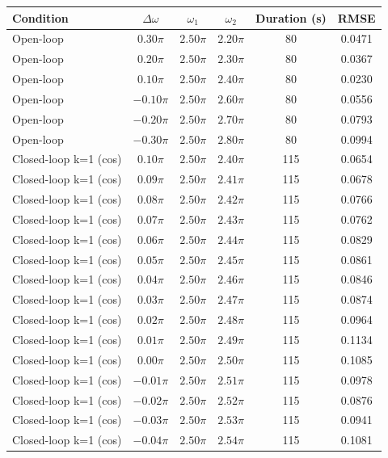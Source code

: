 \begin{tabular}{lccccc}
\toprule
Condition & $\Delta\omega$ & $\omega_1$ & $\omega_2$ & Duration (s) & RMSE \\
\midrule
Open-loop & $0.30\pi$ & $2.50\pi$ & $2.20\pi$ & 80 & 0.0471 \\
Open-loop & $0.20\pi$ & $2.50\pi$ & $2.30\pi$ & 80 & 0.0367 \\
Open-loop & $0.10\pi$ & $2.50\pi$ & $2.40\pi$ & 80 & 0.0230 \\
Open-loop & $-0.10\pi$ & $2.50\pi$ & $2.60\pi$ & 80 & 0.0556 \\
Open-loop & $-0.20\pi$ & $2.50\pi$ & $2.70\pi$ & 80 & 0.0793 \\
Open-loop & $-0.30\pi$ & $2.50\pi$ & $2.80\pi$ & 80 & 0.0994 \\
Closed-loop k=1 (cos) & $0.10\pi$ & $2.50\pi$ & $2.40\pi$ & 115 & 0.0654 \\
Closed-loop k=1 (cos) & $0.09\pi$ & $2.50\pi$ & $2.41\pi$ & 115 & 0.0678 \\
Closed-loop k=1 (cos) & $0.08\pi$ & $2.50\pi$ & $2.42\pi$ & 115 & 0.0766 \\
Closed-loop k=1 (cos) & $0.07\pi$ & $2.50\pi$ & $2.43\pi$ & 115 & 0.0762 \\
Closed-loop k=1 (cos) & $0.06\pi$ & $2.50\pi$ & $2.44\pi$ & 115 & 0.0829 \\
Closed-loop k=1 (cos) & $0.05\pi$ & $2.50\pi$ & $2.45\pi$ & 115 & 0.0861 \\
Closed-loop k=1 (cos) & $0.04\pi$ & $2.50\pi$ & $2.46\pi$ & 115 & 0.0846 \\
Closed-loop k=1 (cos) & $0.03\pi$ & $2.50\pi$ & $2.47\pi$ & 115 & 0.0874 \\
Closed-loop k=1 (cos) & $0.02\pi$ & $2.50\pi$ & $2.48\pi$ & 115 & 0.0964 \\
Closed-loop k=1 (cos) & $0.01\pi$ & $2.50\pi$ & $2.49\pi$ & 115 & 0.1134 \\
Closed-loop k=1 (cos) & $0.00\pi$ & $2.50\pi$ & $2.50\pi$ & 115 & 0.1085 \\
Closed-loop k=1 (cos) & $-0.01\pi$ & $2.50\pi$ & $2.51\pi$ & 115 & 0.0978 \\
Closed-loop k=1 (cos) & $-0.02\pi$ & $2.50\pi$ & $2.52\pi$ & 115 & 0.0876 \\
Closed-loop k=1 (cos) & $-0.03\pi$ & $2.50\pi$ & $2.53\pi$ & 115 & 0.0941 \\
Closed-loop k=1 (cos) & $-0.04\pi$ & $2.50\pi$ & $2.54\pi$ & 115 & 0.1081 \\

\end{tabular}
